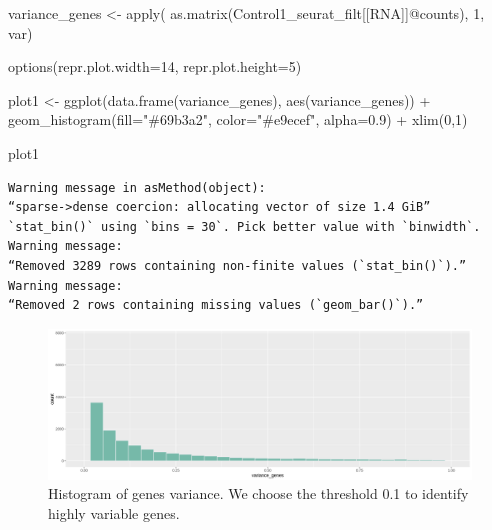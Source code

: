 \documentclass[
  letterpaper,
  DIV=11,
  numbers=noendperiod]{scrartcl}
\newenvironment{Shaded}{\begin{snugshade}}{\end{snugshade}}
\newcommand{\AttributeTok}[1]{\textcolor[rgb]{0.49,0.56,0.16}{#1}}
\newcommand{\DecValTok}[1]{\textcolor[rgb]{0.25,0.63,0.44}{#1}}
\newcommand{\FloatTok}[1]{\textcolor[rgb]{0.25,0.63,0.44}{#1}}
\newcommand{\FunctionTok}[1]{\textcolor[rgb]{0.02,0.16,0.49}{#1}}
\newcommand{\NormalTok}[1]{\textcolor[rgb]{0.00,0.44,0.13}{#1}}
\newcommand{\OtherTok}[1]{\textcolor[rgb]{0.00,0.44,0.13}{#1}}
\newcommand{\SpecialCharTok}[1]{\textcolor[rgb]{0.25,0.44,0.63}{#1}}
\newcommand{\StringTok}[1]{\textcolor[rgb]{0.25,0.44,0.63}{#1}}
\begin{document}
\begin{Shaded}
\begin{Highlighting}[]
\NormalTok{variance\_genes }\OtherTok{\textless{}{-}} \FunctionTok{apply}\NormalTok{( }\FunctionTok{as.matrix}\NormalTok{(Control1\_seurat\_filt[[}\StringTok{\textquotesingle{}RNA\textquotesingle{}}\NormalTok{]]}\SpecialCharTok{@}\NormalTok{counts), }\DecValTok{1}\NormalTok{, var)}

\FunctionTok{options}\NormalTok{(}\AttributeTok{repr.plot.width=}\DecValTok{14}\NormalTok{, }\AttributeTok{repr.plot.height=}\DecValTok{5}\NormalTok{)}

\NormalTok{plot1 }\OtherTok{\textless{}{-}} \FunctionTok{ggplot}\NormalTok{(}\FunctionTok{data.frame}\NormalTok{(variance\_genes), }\FunctionTok{aes}\NormalTok{(variance\_genes)) }\SpecialCharTok{+} 
     \FunctionTok{geom\_histogram}\NormalTok{(}\AttributeTok{fill=}\StringTok{"\#69b3a2"}\NormalTok{, }\AttributeTok{color=}\StringTok{"\#e9ecef"}\NormalTok{, }\AttributeTok{alpha=}\FloatTok{0.9}\NormalTok{) }\SpecialCharTok{+} \FunctionTok{xlim}\NormalTok{(}\DecValTok{0}\NormalTok{,}\DecValTok{1}\NormalTok{)}

\NormalTok{plot1}
\end{Highlighting}
\end{Shaded}

\begin{verbatim}
Warning message in asMethod(object):
“sparse->dense coercion: allocating vector of size 1.4 GiB”
`stat_bin()` using `bins = 30`. Pick better value with `binwidth`.
Warning message:
“Removed 3289 rows containing non-finite values (`stat_bin()`).”
Warning message:
“Removed 2 rows containing missing values (`geom_bar()`).”
\end{verbatim}

\begin{figure}[H]

{\centering \includegraphics{notebook_files/figure-pdf/fig-hvg-output-2.png}

}

\caption{\label{fig-hvg}Histogram of genes variance. We choose the
threshold 0.1 to identify highly variable genes.}

\end{figure}
\end{document}
